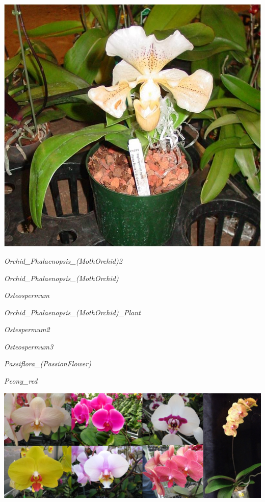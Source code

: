 \documentclass{article}
\begin{document}
\begin{center}
\includegraphics[width=0.9\textheight, angle=90]{../Orchid_Paphiopedilum_(Lady-Slipper)2.jpg}
\end{center}
\newpage

\noindent   
\vfill
\centerline{{\Large\emph{Orchid_Phalaenopsis_(MothOrchid)2}}}
\vfill
\newpage

\noindent   
\vfill
\centerline{{\Large\emph{Orchid_Phalaenopsis_(MothOrchid)}}}
\vfill
\newpage

\noindent   
\vfill
\centerline{{\Large\emph{Osteospermum}}}
\vfill
\newpage

\noindent   
\vfill
\centerline{{\Large\emph{Orchid_Phalaenopsis_(MothOrchid)_Plant}}}
\vfill
\newpage

\noindent   
\vfill
\centerline{{\Large\emph{Ostespermum2}}}
\vfill
\newpage

\noindent   
\vfill
\centerline{{\Large\emph{Osteospermum3}}}
\vfill
\newpage

\noindent   
\vfill
\centerline{{\Large\emph{Passiflora_(PassionFlower)}}}
\vfill
\newpage

\noindent   
\vfill
\centerline{{\Large\emph{Peony_red}}}
\vfill
\newpage

\begin{center}
\includegraphics[width=0.9\textheight, angle=90]{../Orchid_Phalaenopsis_(MothOrchid).jpg}
\end{center}
\newpage
\end{document}
